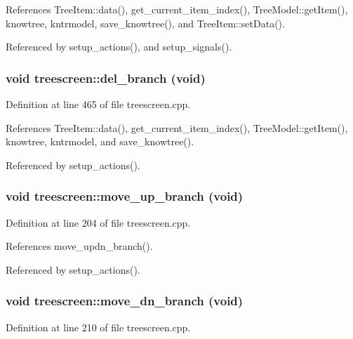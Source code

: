 References Tree\-Item::data(), get\_\-current\_\-item\_\-index(), Tree\-Model::get\-Item(), knowtree, kntrmodel, save\_\-knowtree(), and Tree\-Item::set\-Data().

Referenced by setup\_\-actions(), and setup\_\-signals().
\subsubsection{\setlength{\rightskip}{0pt plus 5cm}void treescreen::del\_\-branch (void)\hspace{0.3cm}{\tt  [private, slot]}}\label{classtreescreen_885306bda7c974cee638bbd06bfb8502}




Definition at line 465 of file treescreen.cpp.

References Tree\-Item::data(), get\_\-current\_\-item\_\-index(), Tree\-Model::get\-Item(), knowtree, kntrmodel, and save\_\-knowtree().

Referenced by setup\_\-actions().
\subsubsection{\setlength{\rightskip}{0pt plus 5cm}void treescreen::move\_\-up\_\-branch (void)\hspace{0.3cm}{\tt  [private, slot]}}\label{classtreescreen_c26f6cf14a9f7affadf7f3bcf878276c}




Definition at line 204 of file treescreen.cpp.

References move\_\-updn\_\-branch().

Referenced by setup\_\-actions().
\subsubsection{\setlength{\rightskip}{0pt plus 5cm}void treescreen::move\_\-dn\_\-branch (void)\hspace{0.3cm}{\tt  [private, slot]}}\label{classtreescreen_d8c480504601e4479ea60b7829965c83}




Definition at line 210 of file treescreen.cpp.

